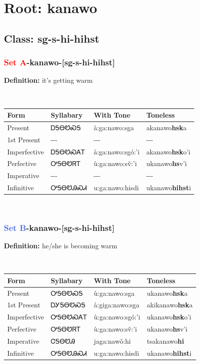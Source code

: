 \needspace{4in}
\section*{Root: kanawo}
\nopagebreak
{}
\needspace{3in}
\subsection*{Class: sg-s-hi-hihst}
\nopagebreak
\needspace{2in}
\subsubsection*{\textcolor{Red}{Set A}{-}\textbf{kanawo}{-}[sg-s-hi-hihst]}
\nopagebreak
\textbf{Definition: } it{\textquoteright}s getting warm
\\[0.5em]
\begin{tabularx}{\textwidth}{l X X X}%
\toprule%
\textbf{Form}&\textbf{Syllabary}&\textbf{With Tone}&\textbf{Toneless}\\%
\midrule%
Present&ᎠᎦᎾᏬᏍᎦ&à:ga:nawo:sga&akanawo\textbf{hsk}a\\%
1st Present&{-}{-}{-}&{-}{-}{-}&{-}{-}{-}\\%
Imperfective&ᎠᎦᎾᏬᏍᎪᎢ&à:ga:nawo:sgó:’i&akanawo\textbf{hsk}o'i\\%
Perfective&ᎤᎦᎾᏬᏒᎢ&ù:ga:nawo:sv̌:’i&ukanawo\textbf{hs}v'i\\%
Imperative&{-}{-}{-}&{-}{-}{-}&{-}{-}{-}\\%
Infinitive&ᎤᎦᎾᏬᎯᏍᏗ&u:ga:nawo:hisdi&ukanawo\textbf{hihst}i\\%
\bottomrule%
\end{tabularx}
\\[1em]
\needspace{2in}
\subsubsection*{\textcolor{RoyalBlue}{Set B}{-}\textbf{kanawo}{-}[sg-s-hi-hihst]}
\nopagebreak
\textbf{Definition: } he/she is becoming warm
\\[0.5em]
\begin{tabularx}{\textwidth}{l X X X}%
\toprule%
\textbf{Form}&\textbf{Syllabary}&\textbf{With Tone}&\textbf{Toneless}\\%
\midrule%
Present&ᎤᎦᎾᏬᏍᎦ&ù:ga:nawo:sga&ukanawo\textbf{hsk}a\\%
1st Present&ᎠᎩᎦᎾᏬᏍᎦ&à:giga:nawo:sga&akikanawo\textbf{hsk}a\\%
Imperfective&ᎤᎦᎾᏬᏍᎪᎢ&ù:ga:nawo:sgó:’i&ukanawo\textbf{hsk}o'i\\%
Perfective&ᎤᎦᎾᏬᏒᎢ&ù:ga:nawo:sv̌:’i&ukanawo\textbf{hs}v'i\\%
Imperative&ᏣᎦᎾᏬᎯ&jaga:nawǒ:hi&tsakanawo\textbf{hi}\\%
Infinitive&ᎤᎦᎾᏬᎯᏍᏗ&u:ga:nawo:hisdi&ukanawo\textbf{hihst}i\\%
\bottomrule%
\end{tabularx}
\\[1em]